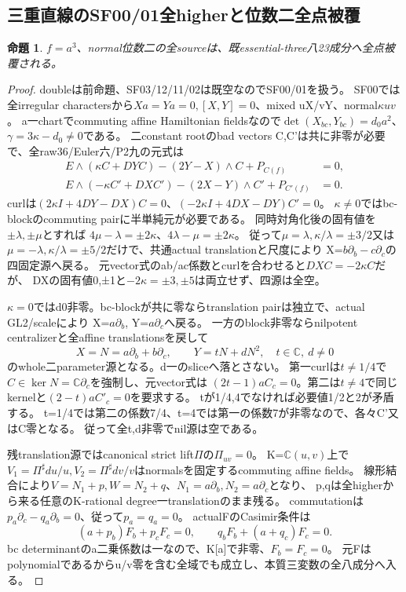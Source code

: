 \documentclass[a4paper,11pt]{ltjsarticle}
\newtheorem{proposition}{命題}[section]
\theoremstyle{definition}
\begin{document}
\subsection{三重直線のSF00/01全higherと位数二全点被覆}
\begin{proposition}\label{prop:plane-triple-line-m2-all-eight-E}
$f=a^3$、normal位数二の全sourceは、既essential-three八23成分へ全点被覆される。
\end{proposition}
\begin{proof}
doubleは前命題、SF03/12/11/02は既空なのでSF00/01を扱う。
SF00では全irregular charactersから$Xa=Ya=0,[X,Y]=0$、mixed uX/vY、normal$\kappa uv$。
a一chartでcommuting affine Hamiltonian fieldsなので$\det(X_{bc},Y_{bc})=d_0a^2$、
$\gamma=3\kappa-d_0\ne0$である。
二constant rootのbad vectors C,C'は共に非零が必要で、全raw36/Euler六/P2九の元式は
\[
\begin{split}
 E\wedge(\kappa C+DY C)-(2Y-X)\wedge C+P_{C(f)}&=0,\\
 E\wedge(-\kappa C'+DX C')-(2X-Y)\wedge C'+P_{C'(f)}&=0.
\end{split}
\]
curlは$(2\kappa I+4DY-DX)C=0$、$(-2\kappa I+4DX-DY)C'=0$。
$\kappa\ne0$ではbc-blockのcommuting pairに半単純元が必要である。
同時対角化後の固有値を$\pm\lambda,\pm\mu$とすれば
$4\mu-\lambda=\pm2\kappa$、$4\lambda-\mu=\pm2\kappa$。
従って$\mu=\lambda,\kappa/\lambda=\pm3/2$又は
$\mu=-\lambda,\kappa/\lambda=\pm5/2$だけで、共通actual translationと尺度により
X=$b\partial_b-c\partial_c$の四固定源へ戻る。
元vector式のab/ac係数とcurlを合わせると$DX C=-2\kappa C$だが、
DXの固有値0,±1と$-2\kappa=\pm3,\pm5$は両立せず、四源は全空。

$\kappa=0$ではd0非零。bc-blockが共に零ならtranslation pairは独立で、actual GL2/scaleにより
X=$a\partial_b$, Y=$a\partial_c$へ戻る。
一方のblock非零ならnilpotent centralizerと全affine translationsを戻して
\[
 X=N=a\partial_b+b\partial_c,\qquad Y=tN+dN^2,\quad t\in\mathbb C,\ d\ne0
\]
のwhole二parameter源となる。d一のsliceへ落とさない。
第一curlは$t\ne1/4$で$C\in\ker N=\mathbb C\partial_c$を強制し、元vector式は
$(2t-1)aC_c=0$。第二は$t\ne4$で同じkernelと$(2-t)aC'_c=0$を要求する。
tが1/4,4でなければ必要値1/2と2が矛盾する。
t=1/4では第二の係数7/4、t=4では第一の係数7が非零なので、各々C'又はC零となる。
従って全t,d非零でnil源は空である。

残translation源ではcanonical strict lift$\Pi$の$\Pi_{uv}=0$。
K=$\mathbb C(u,v)$上で$V_1=\Pi^\sharp du/u,V_2=\Pi^\sharp dv/v$はnormalsを固定するcommuting affine fields。
線形結合により$V=N_1+p,W=N_2+q$、$N_1=a\partial_b,N_2=a\partial_c$となり、
p,qは全higherから来る任意のK-rational degree一translationのまま残る。
commutationは$p_a\partial_c-q_a\partial_b=0$、従って$p_a=q_a=0$。
actualFのCasimir条件は
\[
 (a+p_b)F_b+p_cF_c=0,\qquad q_bF_b+(a+q_c)F_c=0.
\]
bc determinantのa二乗係数は一なので、K[a]で非零、$F_b=F_c=0$。
元Fはpolynomialであるからu/v零を含む全域でも成立し、本質三変数の全八成分へ入る。


\end{proof}
\end{document}
